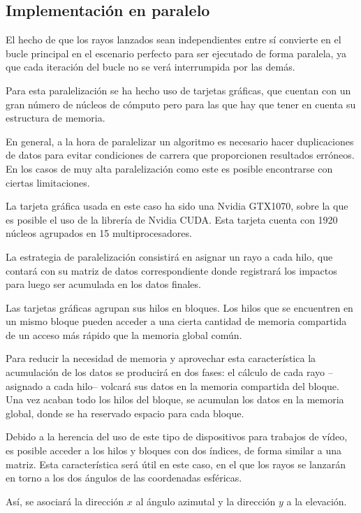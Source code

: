 \subsection{Implementación en paralelo}

El hecho de que los rayos lanzados sean independientes entre sí convierte en el bucle principal en el escenario perfecto para ser ejecutado de forma paralela, ya que cada iteración del bucle no se verá interrumpida por las demás.

Para esta paralelización se ha hecho uso de tarjetas gráficas, que cuentan con un gran número de núcleos de cómputo pero para las que hay que tener en cuenta su estructura de memoria.

En general, a la hora de paralelizar un algoritmo es necesario hacer duplicaciones de datos para evitar condiciones de carrera que proporcionen resultados erróneos.
En los casos de muy alta paralelización como este es posible encontrarse con ciertas limitaciones.

La tarjeta gráfica usada en este caso ha sido una Nvidia GTX1070, sobre la que es posible el uso de la librería de Nvidia CUDA.
Esta tarjeta cuenta con 1920 núcleos agrupados en 15 multiprocesadores.

La estrategia de paralelización consistirá en asignar un rayo a cada hilo, que contará con su matriz de datos correspondiente donde registrará los impactos para luego ser acumulada en los datos finales.

Las tarjetas gráficas agrupan sus hilos en bloques.
Los hilos que se encuentren en un mismo bloque pueden acceder a una cierta cantidad de memoria compartida de un acceso más rápido que la memoria global común.

Para reducir la necesidad de memoria y aprovechar esta característica la acumulación de los datos se producirá en dos fases: el cálculo de cada rayo --asignado a cada hilo-- volcará sus datos en la memoria compartida del bloque.
Una vez acaban todo los hilos del bloque, se acumulan los datos en la memoria global, donde se ha reservado espacio para cada bloque.

Debido a la herencia del uso de este tipo de dispositivos para trabajos de vídeo, es posible acceder a los hilos y bloques con dos índices, de forma similar a una matriz.
Esta característica será útil en este caso, en el que los rayos se lanzarán en torno a los dos ángulos de las coordenadas esféricas.

Así, se asociará la dirección $x$ al ángulo azimutal y la dirección $y$ a la elevación.

